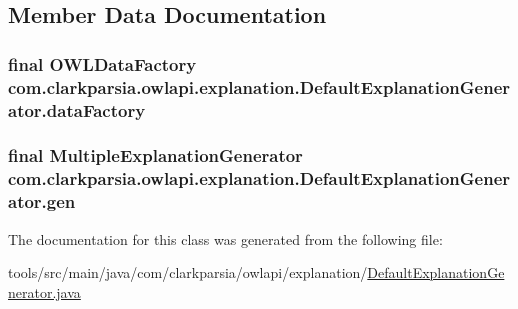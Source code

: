 \subsection{Member Data Documentation}
\hypertarget{classcom_1_1clarkparsia_1_1owlapi_1_1explanation_1_1_default_explanation_generator_ac1ca03bbacd6a3f8b4311f4395427269}{
\subsubsection[{data\-Factory}]{\setlength{\rightskip}{0pt plus 5cm}final {\bf O\-W\-L\-Data\-Factory} com.\-clarkparsia.\-owlapi.\-explanation.\-Default\-Explanation\-Generator.\-data\-Factory\hspace{0.3cm}{\ttfamily [private]}}}\label{classcom_1_1clarkparsia_1_1owlapi_1_1explanation_1_1_default_explanation_generator_ac1ca03bbacd6a3f8b4311f4395427269}
\hypertarget{classcom_1_1clarkparsia_1_1owlapi_1_1explanation_1_1_default_explanation_generator_a1a8e2c3938849567ca8e349f9fc8f2cc}{
\subsubsection[{gen}]{\setlength{\rightskip}{0pt plus 5cm}final {\bf Multiple\-Explanation\-Generator} com.\-clarkparsia.\-owlapi.\-explanation.\-Default\-Explanation\-Generator.\-gen\hspace{0.3cm}{\ttfamily [private]}}}\label{classcom_1_1clarkparsia_1_1owlapi_1_1explanation_1_1_default_explanation_generator_a1a8e2c3938849567ca8e349f9fc8f2cc}


The documentation for this class was generated from the following file\-:\begin{DoxyCompactItemize}
\item 
tools/src/main/java/com/clarkparsia/owlapi/explanation/\hyperlink{_default_explanation_generator_8java}{Default\-Explanation\-Generator.\-java}\end{DoxyCompactItemize}
